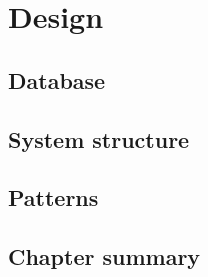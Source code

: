 \chapter{Design}
\label{chap:Design}

\section{Database}
\label{sec:Database}

\section{System structure}
\label{sec:System structure}

\section{Patterns}
\label{sec:Patterns}

\section{Chapter summary}
